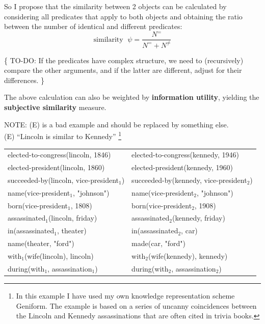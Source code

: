 So I propose that the similarity between 2 objects can be calculated by considering all predicates that apply to both objects and obtaining the ratio between the number of identical and different predicates:
\begin{equation}
\mbox{similarity } \; \psi = \frac{N^{=}}{N^{=} + N^{\neq}}
\end{equation}

\{ TO-DO:  If the predicates have complex structure, we need to (recursively) compare the other arguments, and if the latter are different, adjust for their differences. \}

The above calculation can also be weighted by \textbf{information utility}, yielding the \textbf{subjective similarity} measure.

NOTE:  (E) is a bad example and should be replaced by something else.\\
(E) ``Lincoln is similar to Kennedy''
\footnote{In this example I have used my own knowledge representation scheme Geniform.  The example is based on a series of uncanny coincidences between the Lincoln and Kennedy assassinations that are often cited in trivia books.}
\\
\hspace*{1cm} \begin{tabular}{l|l}
elected-to-congress(lincoln, 1846)        & elected-to-congress(kennedy, 1946)\\
elected-president(lincoln, 1860)          & elected-president(kennedy, 1960)\\
succeeded-by(lincoln, vice-president$_1$) & succeeded-by(kennedy, vice-president$_2$)\\
\hspace*{1cm} name(vice-president$_1$, "johnson") &
\hspace*{1cm} name(vice-president$_2$, "johnson")\\
\hspace*{1cm} born(vice-president$_1$, 1808) &
\hspace*{1cm} born(vice-president$_2$, 1908)\\
assassinated$_1$(lincoln, friday)         & assassinated$_2$(kennedy, friday)\\
in(assassinated$_1$, theater)             & in(assassinated$_2$, car)\\
name(theater, "ford")                     & made(car, "ford")\\
with$_1$(wife(lincoln), lincoln)          & with$_2$(wife(kennedy), kennedy)\\
\hspace*{1cm} during(with$_1$, assassination$_1$) &
\hspace*{1cm} during(with$_2$, assassination$_2$)\\
\end{tabular}

